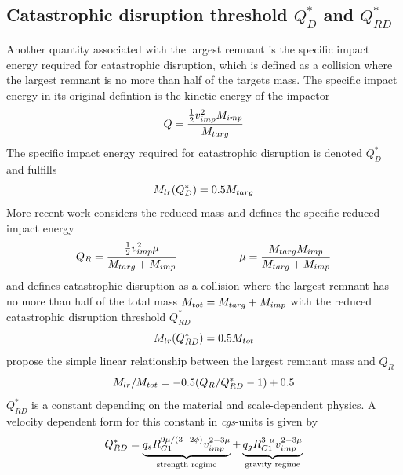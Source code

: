\subsection{Catastrophic disruption threshold $Q^*_D$ and $Q^*_{RD}$}
Another quantity associated with the largest remnant is the specific impact energy required for catastrophic disruption, which is defined as a collision where the largest remnant is no more than half of the targets mass. The specific impact energy in its original defintion \cite{Benz1999Icar..142....5B} is the kinetic energy of the impactor 
\begin{equation}
Q = \frac{ \frac{1}{2} v_{imp}^2 M_{imp} }{M_{targ}} 
\end{equation}
The specific impact energy required for catastrophic disruption is denoted $Q^*_D$ and fulfills
\begin{equation}
M_{lr}(Q^*_D) = 0.5 M_{targ}
\end{equation}
More recent work \citep{Stewart:2009p3265, 2009ApJ...700L.118M, 2010ApJ...712L..73M, Leinhardt:2011p4060} considers the reduced mass and defines the specific reduced impact energy 
\begin{equation}
Q_R = \frac{ \frac{1}{2} v_{imp}^2 \mu }{M_{targ} + M_{imp}} \hspace{2.0cm} \mu = \frac{M_{targ} M_{imp}}{M_{targ} + M_{imp}} 
\end{equation}
and defines catastrophic disruption as a collision where the largest remnant has no more than half of the total mass $M_{tot} = M_{targ} + M_{imp}$ with the reduced catastrophic disruption threshold $Q^*_{RD}$
\begin{equation}
M_{lr}(Q^*_{RD}) = 0.5 M_{tot}
\end{equation}
\cite{Stewart:2009p3265} propose the simple linear relationship between the largest remnant mass and $Q_R$
\begin{equation}
\label{ch03_eq003}
M_{lr} / M_{tot} = - 0.5 ( Q_R / Q^*_{RD} - 1 ) + 0.5
\end{equation}
$Q^*_{RD}$ is a constant depending on the material and scale-dependent physics. A velocity dependent form for this constant in \emph{cgs}-units is given by
\begin{equation}
Q^*_{RD} = \underbrace{ q_s R^{9\mu/(3-2\phi)}_{C1} \vimp^{2-3\mu} }_{\textrm{strength regime} } + \underbrace{ q_g R^{3 \mu}_{C1} \vimp^{2-3\mu}}_{\textrm{gravity regime}}
\end{equation}
